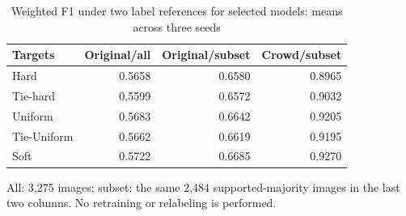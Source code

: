 \begin{table}[t]
\caption{Weighted F1 under two label references for selected models: means across three seeds}\label{tab:samef1}
\centering\begin{tabular}{lrrr}\toprule
Targets & Original/all & Original/subset & Crowd/subset\\\midrule
Hard & 0.5658 & 0.6580 & 0.8965\\
Tie-hard & 0.5599 & 0.6572 & 0.9032\\
Uniform & 0.5683 & 0.6642 & 0.9205\\
Tie-Uniform & 0.5662 & 0.6619 & 0.9195\\
Soft & 0.5722 & 0.6685 & 0.9270\\
\bottomrule\end{tabular}\par
All: 3,275 images; subset: the same 2,484 supported-majority images in the last two columns. No retraining or relabeling is performed.
\end{table}
